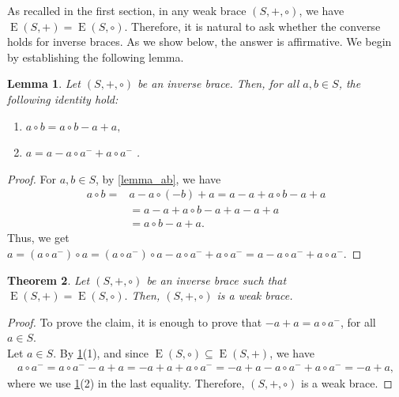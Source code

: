 \documentclass[preprint,1p]{elsarticle}
\newtheorem{theor}{Theorem}[section]
\newtheorem{lemma}[theor]{Lemma}
\theoremstyle{definition}               %
\DeclareMathOperator{\E}{E}
\begin{document}
As recalled in the first section, in any weak brace $(S,+,\circ)$, we have $\E(S,+)=\E(S,\circ)$. Therefore, it is natural to ask whether the converse holds for inverse braces. As we show below, the answer is affirmative. We begin by establishing the following lemma.

\begin{lemma}\label{lemma_1}
    Let $(S,+,\circ)$ be an inverse brace. Then, for all $a,b\in S$, the following identity hold: 
\begin{enumerate}
\item[\rm{(1)}] $a\circ b = a\circ b -a+a,$
\item[\rm{(2)}] $a= a -a \circ a^-+a\circ a^-$ .
\end{enumerate}
\end{lemma}  
\begin{proof}
For $a, b \in S$, by \cref{lemma_ab}, we have 
   \begin{align*}
  a\circ b=& a - a\circ (-b)+a = a-a+a\circ b-a+a\\
  &=a-a+a\circ b -a+a-a+a\\&=a\circ b-a+a.
  \end{align*}
Thus, we get
$
a = (a\circ a^-)\circ a = (a\circ a^-)\circ a - a\circ a^- + a\circ a^- = a - a\circ a^-+a\circ a^-.
$
 \end{proof}     
\medskip\medskip

\begin{theor}\label{teo_inverse_weak}
    Let $(S,+,\circ)$ be an inverse brace such that $\E(S,+)=\E(S,\circ).$ Then, $(S,+,\circ)$ is a weak brace.
\end{theor}
\begin{proof}
    To prove the claim, it is enough to prove that $-a+a=a\circ a^-$, for all $a \in S$.\\
 Let $a \in S$. By \cref{lemma_1}(1), and since  $\E(S, \circ) \subseteq \E(S, +)$, we have
      \begin{align*}
          a\circ a^-= a\circ a^- -a+a =-a+a+a\circ a^-= -a+a-a\circ a^- + a\circ a^- = -a+a,
      \end{align*}
where we use \cref{lemma_1}(2) in the last equality. Therefore, $(S, +, \circ)$ is a weak brace.
 \end{proof}

\smallskip
\end{document}
